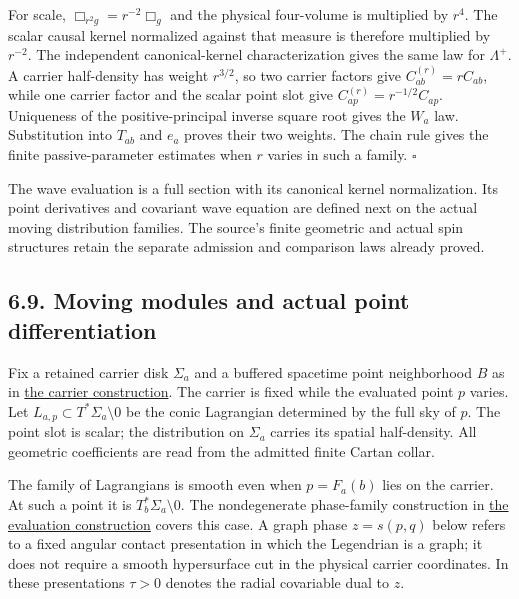 \documentclass[
  english,
  11pt,
  reqno]{amsart}
\begin{document}
For scale, \(\Box_{r^2g}=r^{-2}\Box_g\) and the physical four-volume is
multiplied by \(r^4\). The scalar causal kernel normalized against that
measure is therefore multiplied by \(r^{-2}\). The independent
canonical-kernel characterization gives the same law for \(\Lambda^+\).
A carrier half-density has weight \(r^{3/2}\), so two carrier factors
give \(C_{ab}^{(r)}=rC_{ab}\), while one carrier factor and the scalar
point slot give \(C_{ap}^{(r)}=r^{-1/2}C_{ap}\). Uniqueness of the
positive-principal inverse square root gives the \(W_a\) law.
Substitution into \(T_{ab}\) and \(e_a\) proves their two weights. The
chain rule gives the finite passive-parameter estimates when \(r\)
varies in such a family. \hfill\(\square\)

The wave evaluation is a full section with its canonical kernel
normalization. Its point derivatives and covariant wave equation are
defined next on the actual moving distribution families. The source's
finite geometric and actual spin structures retain the separate
admission and comparison laws already proved.

\subsection{6.9. Moving modules and actual point
differentiation}\label{moving-modules-and-actual-point-differentiation}\label{sec:online-moving-wave-modules}

Fix a retained carrier disk \(\Sigma_a\) and a buffered spacetime point
neighborhood \(B\) as in \hyperref[def:online-wave-carrier-displays]{the
carrier construction}. The carrier is fixed while the evaluated point
\(p\) varies. Let \(L_{a,p}\subset T^*\Sigma_a\setminus0\) be the conic
Lagrangian determined by the full sky of \(p\). The point slot is
scalar; the distribution on \(\Sigma_a\) carries its spatial
half-density. All geometric coefficients are read from the admitted
finite Cartan collar.

The family of Lagrangians is smooth even when \(p=F_a(b)\) lies on the
carrier. At such a point it is \(T_b^*\Sigma_a\setminus0\). The
nondegenerate phase-family construction in
\hyperref[def:online-wave-evaluation-section]{the evaluation
construction} covers this case. A graph phase \(z=s(p,q)\) below refers
to a fixed angular contact presentation in which the Legendrian is a
graph; it does not require a smooth hypersurface cut in the physical
carrier coordinates. In these presentations \(\tau>0\) denotes the
radial covariable dual to \(z\).
\end{document}
